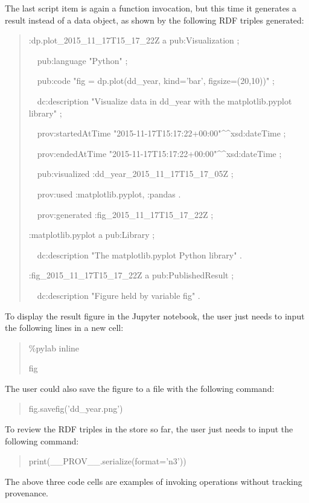 The last script item is again a function invocation, but this time it generates a result instead of a data object, as shown by the following RDF triples generated:
\begin{quotation}
	\noindent:dp.plot\_2015\_11\_17T15\_17\_22Z a pub:Visualization ;
	
	\noindent\ \ pub:language "Python" ;
	
	\noindent\ \ pub:code "fig = dp.plot(dd\_year, kind='bar', figsize=(20,10))" ;
	
	\noindent\ \ dc:description "Visualize data in dd\_year with the matplotlib.pyplot library" ;
	
	\noindent\ \ prov:startedAtTime "2015-11-17T15:17:22+00:00"\^{}\^{}xsd:dateTime ;
	
	\noindent\ \ prov:endedAtTime "2015-11-17T15:17:22+00:00"\^{}\^{}xsd:dateTime ;
	
	\noindent\ \ pub:visualized :dd\_year\_2015\_11\_17T15\_17\_05Z ;
	
	\noindent\ \ prov:used :matplotlib.pyplot, :pandas .
	
	\noindent\ \ prov:generated :fig\_2015\_11\_17T15\_17\_22Z ;
	
	\noindent:matplotlib.pyplot a pub:Library ;
	
	\noindent\ \ dc:description "The matplotlib.pyplot Python library" .
	
	\noindent:fig\_2015\_11\_17T15\_17\_22Z a pub:PublishedResult ;
	
	\noindent\ \ dc:description "Figure held by variable fig" .
\end{quotation}
To display the result figure in the Jupyter notebook, the user just needs to input the following lines in a new cell:
\begin{quotation}
\noindent\%pylab inline

\noindent fig
\end{quotation}
The user could also save the figure to a file with the following command:
\begin{quotation}
	\noindent fig.savefig('dd\_year.png')
\end{quotation}
To review the RDF triples in the store so far, the user just needs to input the following command:
\begin{quotation}
	\noindent print(\_\_PROV\_\_.serialize(format='n3'))
\end{quotation}
The above three code cells are examples of invoking operations without tracking provenance.

